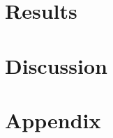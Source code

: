 \documentclass{article}
\theoremstyle{definition}
\theoremstyle{remark}
\begin{document}
\section{Results}



\section{Discussion}



\section*{Appendix}





\end{document}
